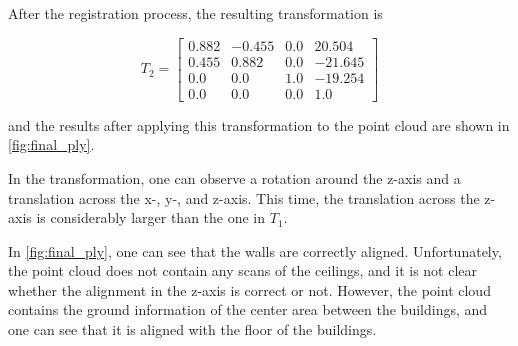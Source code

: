         After the registration process, the resulting transformation is

        \begin{equation*}
            T_2 = 
            \begin{bmatrix}
                0.882 & -0.455 & 0.0 & 20.504 \\ 
                0.455 & 0.882 & 0.0 & -21.645 \\
                0.0 & 0.0 & 1.0 & -19.254 \\
                0.0 & 0.0 & 0.0 & 1.0
            \end{bmatrix}    
        \end{equation*}
        
        and the results after applying this transformation to the point cloud are shown in \autoref{fig:final_ply}.        

        In the transformation, one can observe a rotation around the z-axis and a translation across the x-, y-, and z-axis.
        This time, the translation across the z-axis is considerably larger than the one in $T_1$.

        In \autoref{fig:final_ply}, one can see that the walls are correctly aligned.
        Unfortunately, the point cloud does not contain any scans of the ceilings, and it is not clear whether the alignment in the z-axis is correct or not. 
        However, the point cloud contains the ground information of the center area between the buildings, 
        and one can see that it is aligned with the floor of the buildings.
        
